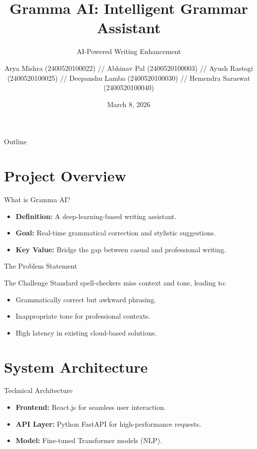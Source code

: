\documentclass{beamer}
\title[Gramma AI]{Gramma AI: Intelligent Grammar Assistant}
\subtitle{AI-Powered Writing Enhancement}
\author{
Arya Mishra       (2400520100022) //
Abhinav Pal       (2400520100003) //
Ayush Rastogi     (2400520100025) //
Deepanshu Lamba   (2400520100030) //
Hemendra Saraswat (2400520100040)
}
\institute{Department of Computer Science}
\date{March 8, 2026}
\begin{document}
\begin{frame}
    \titlepage
\end{frame}

\begin{frame}{Outline}
    \tableofcontents
\end{frame}

\section{Project Overview}
\begin{frame}{What is Gramma AI?}
    \begin{itemize}
        \item \textbf{Definition:} A deep-learning-based writing assistant.
        \item \textbf{Goal:} Real-time grammatical correction and stylistic suggestions.
        \item \textbf{Key Value:} Bridge the gap between casual and professional writing.
    \end{itemize}
\end{frame}

\begin{frame}{The Problem Statement}
    \begin{block}{The Challenge}
        Standard spell-checkers miss context and tone, leading to:
    \end{block}
    \begin{itemize}
        \item Grammatically correct but awkward phrasing.
        \item Inappropriate tone for professional contexts.
        \item High latency in existing cloud-based solutions.
    \end{itemize}
\end{frame}

\section{System Architecture}
\begin{frame}{Technical Architecture}
    \begin{center}
        
    \end{center}
    \begin{itemize}
        \item \textbf{Frontend:} React.js for seamless user interaction.
        \item \textbf{API Layer:} Python FastAPI for high-performance requests.
        \item \textbf{Model:} Fine-tuned Transformer models (NLP).
    \end{itemize}
\end{frame}
\end{document}
